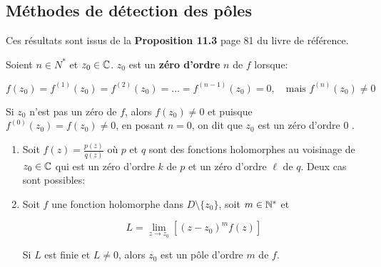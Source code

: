 \subsection{Méthodes de détection des pôles}

\begin{note}
    Ces résultats sont issus de la \textbf{Proposition 11.3} page 81 du livre de référence.
\end{note}

\begin{definition}
    Soient $n \in N^\ast$ et $z_0 \in \mathbb{C}$. $z_0$ est un \textbf{zéro d'ordre} $n$ de $f$ lorsque:
    
    \[ f(z_0) = f^{(1)}(z_0) = f^{(2)}(z_0) = \ldots = f^{(n-1)}(z_0) = 0 , \quad \textrm{mais } f^{(n)}(z_0) \neq 0 \]
\end{definition}

\begin{convention}
    Si $z_0$ n'est pas un zéro de $f$, alors $f(z_0) \neq 0$ et puisque $f^{(0)}(z_0) = f(z_0) \neq 0$, en posant $n=0$, on dit que \og $z_0$ est un zéro d'ordre 0 \fg{}.
\end{convention}

\begin{method}\hfill
    
    \begin{enumerate}[label=\alph*)]
    \item 
    Soit $f(z) = \frac{p(z)}{q(z)}$ où $p$ et $q$ sont des fonctions holomorphes au voisinage de $z_0 \in \mathbb{C}$ qui est un zéro d'ordre $k$ de $p$ et un zéro d'ordre $\ell$ de $q$.
    Deux cas sont possibles:

    \item 
    Soit $f$ une fonction holomorphe dans $D \setminus \{z_0\}$, soit $m \in \mathbb{N}^\ast$ et
    
    \[ L = \lim\limits_{z \rightarrow z_0} \left[ (z - z_0)^m f(z) \right] \]
    
    Si $L$ est finie et $L \neq 0$, alors $z_0$ est un pôle d'ordre $m$ de $f$.
    \end{enumerate}
\end{method}

